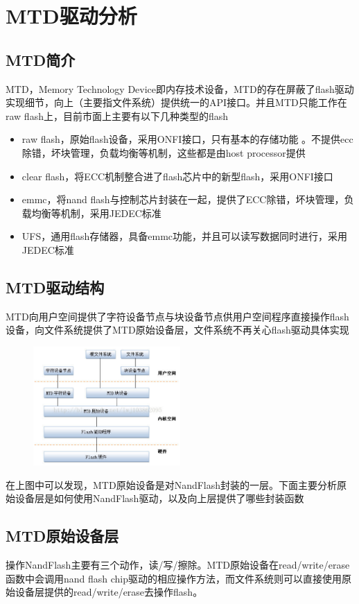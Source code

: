 \chapter{MTD驱动分析}
\section{MTD简介}
MTD，Memory Technology Device即内存技术设备，MTD的存在屏蔽了flash驱动实现细节，向上（主要指文件系统）提供统一的API接口。并且MTD只能工作在raw flash上，目前市面上主要有以下几种类型的flash
\begin{itemize}
  \item raw flash，原始flash设备，采用ONFI接口，只有基本的存储功能 。不提供ecc除错，坏块管理，负载均衡等机制，这些都是由host processor提供
  \item clear flash，将ECC机制整合进了flash芯片中的新型flash，采用ONFI接口
  \item emmc，将nand flash与控制芯片封装在一起，提供了ECC除错，坏块管理，负载均衡等机制，采用JEDEC标准 
  \item UFS，通用flash存储器，具备emmc功能，并且可以读写数据同时进行，采用JEDEC标准
\end{itemize}

\section{MTD驱动结构}
MTD向用户空间提供了字符设备节点与块设备节点供用户空间程序直接操作flash设备，向文件系统提供了MTD原始设备层，文件系统不再关心flash驱动具体实现

\begin{figure}[htbp]
\centering
\includegraphics[keepaspectratio,width=0.5\textwidth,height=0.75\textheight]{img/mtd_struct.png}
\end{figure}
在上图中可以发现，MTD原始设备是对NandFlash封装的一层。下面主要分析原始设备层是如何使用NandFlash驱动，以及向上层提供了哪些封装函数

\section{MTD原始设备层}
操作NandFlash主要有三个动作，读/写/擦除。MTD原始设备在read/write/erase函数中会调用nand flash chip驱动的相应操作方法，而文件系统则可以直接使用原始设备层提供的read/write/erase去操作flash。
\clearpage
